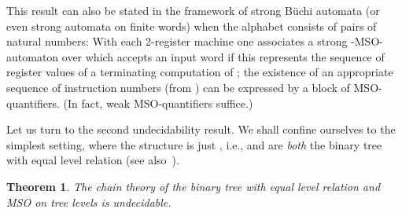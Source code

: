 \documentclass[copyright,creativecommons]{eptcs}
\newtheorem{theorem}{Theorem}
\theoremstyle{plain}
\theoremstyle{nonumberplain}
\begin{document}
This result can also be stated in the framework of strong 
B\"uchi automata (or even strong automata on finite words) when 
the alphabet consists of pairs of natural numbers: 
With each 2-register machine  one associates 
a strong -MSO-automaton  over 
which accepts an input word  if this represents 
the sequence of register values of a terminating computation of ; the 
existence of an appropriate sequence of instruction numbers (from )
can be expressed by a block  of MSO-quantifiers. 
(In fact, weak MSO-quantifiers suffice.)    
   
Let us turn to the second undecidability result. We shall confine ourselves to the 
 simplest setting, where the structure  is just , 
 i.e.,  and  are \emph{both} the binary tree with 
 equal level relation (see also~\cite{tho09}). 
 
\begin{theorem}
The chain theory of the binary tree with equal level relation and 
MSO on tree levels is undecidable. 
\end{theorem}
\end{document}
